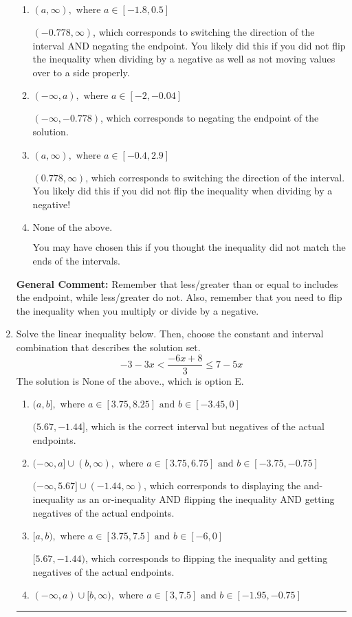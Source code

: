 \documentclass{extbook}[14pt]
\newcommand{\litem}[1]{\item #1

\rule{\textwidth}{0.4pt}}
\begin{document}
\begin{enumerate}
{\begin{enumerate}[label=\Alph*.]
* $(-\infty, 0.778)$, which is the correct option.
\item \( (a, \infty), \text{ where } a \in [-1.8, 0.5] \)

 $(-0.778, \infty)$, which corresponds to switching the direction of the interval AND negating the endpoint. You likely did this if you did not flip the inequality when dividing by a negative as well as not moving values over to a side properly.
\item \( (-\infty, a), \text{ where } a \in [-2, -0.04] \)

 $(-\infty, -0.778)$, which corresponds to negating the endpoint of the solution.
\item \( (a, \infty), \text{ where } a \in [-0.4, 2.9] \)

 $(0.778, \infty)$, which corresponds to switching the direction of the interval. You likely did this if you did not flip the inequality when dividing by a negative!
\item \( \text{None of the above}. \)

You may have chosen this if you thought the inequality did not match the ends of the intervals.
\end{enumerate}

\textbf{General Comment:} Remember that less/greater than or equal to includes the endpoint, while less/greater do not. Also, remember that you need to flip the inequality when you multiply or divide by a negative.
}
\litem{
Solve the linear inequality below. Then, choose the constant and interval combination that describes the solution set.
\[ -3 - 3 x < \frac{-6 x + 8}{3} \leq 7 - 5 x \]The solution is \( \text{None of the above.} \), which is option E.\begin{enumerate}[label=\Alph*.]
\item \( (a, b], \text{ where } a \in [3.75, 8.25] \text{ and } b \in [-3.45, 0] \)

$(5.67, -1.44]$, which is the correct interval but negatives of the actual endpoints.
\item \( (-\infty, a] \cup (b, \infty), \text{ where } a \in [3.75, 6.75] \text{ and } b \in [-3.75, -0.75] \)

$(-\infty, 5.67] \cup (-1.44, \infty)$, which corresponds to displaying the and-inequality as an or-inequality AND flipping the inequality AND getting negatives of the actual endpoints.
\item \( [a, b), \text{ where } a \in [3.75, 7.5] \text{ and } b \in [-6, 0] \)

$[5.67, -1.44)$, which corresponds to flipping the inequality and getting negatives of the actual endpoints.
\item \( (-\infty, a) \cup [b, \infty), \text{ where } a \in [3, 7.5] \text{ and } b \in [-1.95, -0.75] \)


\end{enumerate}}
\end{enumerate}
\end{document}
